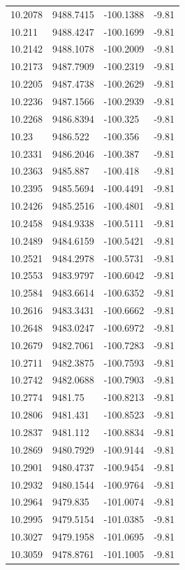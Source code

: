 \begin{table}[H]
\begin{tabular}{llll}
10.2078 & 9488.7415 & -100.1388 & -9.81 \\
10.211 & 9488.4247 & -100.1699 & -9.81 \\
10.2142 & 9488.1078 & -100.2009 & -9.81 \\
10.2173 & 9487.7909 & -100.2319 & -9.81 \\
10.2205 & 9487.4738 & -100.2629 & -9.81 \\
10.2236 & 9487.1566 & -100.2939 & -9.81 \\
10.2268 & 9486.8394 & -100.325 & -9.81 \\
10.23 & 9486.522 & -100.356 & -9.81 \\
10.2331 & 9486.2046 & -100.387 & -9.81 \\
10.2363 & 9485.887 & -100.418 & -9.81 \\
10.2395 & 9485.5694 & -100.4491 & -9.81 \\
10.2426 & 9485.2516 & -100.4801 & -9.81 \\
10.2458 & 9484.9338 & -100.5111 & -9.81 \\
10.2489 & 9484.6159 & -100.5421 & -9.81 \\
10.2521 & 9484.2978 & -100.5731 & -9.81 \\
10.2553 & 9483.9797 & -100.6042 & -9.81 \\
10.2584 & 9483.6614 & -100.6352 & -9.81 \\
10.2616 & 9483.3431 & -100.6662 & -9.81 \\
10.2648 & 9483.0247 & -100.6972 & -9.81 \\
10.2679 & 9482.7061 & -100.7283 & -9.81 \\
10.2711 & 9482.3875 & -100.7593 & -9.81 \\
10.2742 & 9482.0688 & -100.7903 & -9.81 \\
10.2774 & 9481.75 & -100.8213 & -9.81 \\
10.2806 & 9481.431 & -100.8523 & -9.81 \\
10.2837 & 9481.112 & -100.8834 & -9.81 \\
10.2869 & 9480.7929 & -100.9144 & -9.81 \\
10.2901 & 9480.4737 & -100.9454 & -9.81 \\
10.2932 & 9480.1544 & -100.9764 & -9.81 \\
10.2964 & 9479.835 & -101.0074 & -9.81 \\
10.2995 & 9479.5154 & -101.0385 & -9.81 \\
10.3027 & 9479.1958 & -101.0695 & -9.81 \\
10.3059 & 9478.8761 & -101.1005 & -9.81 \\

\end{tabular}
\end{table}
